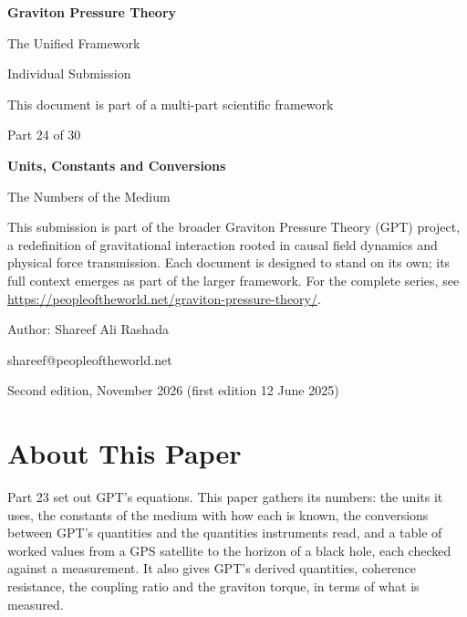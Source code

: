 \documentclass[11pt,a4paper]{article}
\begin{document}
\renewcommand{\thetable}{24.\arabic{table}}
\begin{titlepage}
\centering
\vspace*{1.5cm}
{\Huge\bfseries Graviton Pressure Theory\par}
\vspace{0.4cm}
{\Large The Unified Framework\par}
{\large Individual Submission\par}
\vspace{0.3cm}
{\normalsize This document is part of a multi-part scientific framework\par}
\vspace{1.6cm}
{\large Part 24 of 30\par}
\vspace{0.6cm}
{\huge\bfseries Units, Constants and Conversions\par}
\vspace{0.5cm}
{\Large The Numbers of the Medium\par}
\vspace{1.4cm}
\begin{minipage}{0.82\textwidth}\centering\small
This submission is part of the broader Graviton Pressure Theory (GPT) project, a redefinition of gravitational interaction rooted in causal field dynamics and physical force transmission. Each document is designed to stand on its own; its full context emerges as part of the larger framework. For the complete series, see \url{https://peopleoftheworld.net/graviton-pressure-theory/}.
\end{minipage}
\vfill
{\large Author: Shareef Ali Rashada\par}
{\normalsize shareef@peopleoftheworld.net\par}
\vspace{0.3cm}
{\normalsize Second edition, November 2026 \quad (first edition 12 June 2025)\par}
\end{titlepage}

\tableofcontents
\newpage

\section*{About This Paper}

Part 23 set out GPT's equations. This paper gathers its numbers: the units it uses, the constants of the medium with how each is known, the conversions between GPT's quantities and the quantities instruments read, and a table of worked values from a GPS satellite to the horizon of a black hole, each checked against a measurement. It also gives GPT's derived quantities, coherence resistance, the coupling ratio and the graviton torque, in terms of what is measured.
\end{document}
